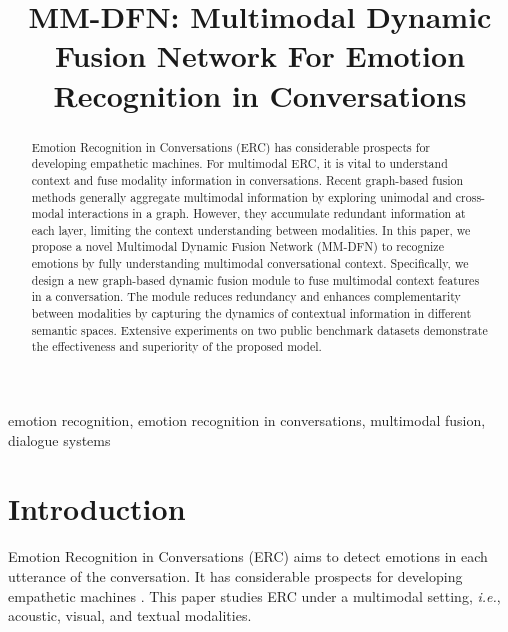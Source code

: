 \documentclass{article}
\title{MM-DFN: Multimodal Dynamic Fusion Network For Emotion Recognition in Conversations}
\begin{document}
\maketitle
\begin{abstract}


  Emotion Recognition in Conversations (ERC) has considerable prospects for developing empathetic machines. For multimodal ERC, it is vital to understand context and fuse modality information in conversations. Recent graph-based fusion methods generally aggregate multimodal information by exploring unimodal and cross-modal interactions in a graph. However, they accumulate redundant information at each layer, limiting the context understanding between modalities. In this paper, we propose a novel Multimodal Dynamic Fusion Network (MM-DFN) to recognize emotions by fully understanding multimodal conversational context. Specifically, we design a new graph-based dynamic fusion module to fuse multimodal context features in a conversation.  The module reduces redundancy and enhances complementarity between modalities by capturing the dynamics of contextual information in different semantic spaces. Extensive experiments on two public benchmark datasets demonstrate the effectiveness and superiority of the proposed model. 
\end{abstract}


\begin{keywords}
emotion recognition, emotion recognition in conversations, multimodal fusion, dialogue systems
\end{keywords}






\section{Introduction}
\label{sec:intro}
Emotion Recognition in Conversations (ERC) aims to detect emotions in each utterance of the conversation.  It has considerable prospects for developing empathetic machines \cite{DBLP:journals/inffus/MaNXC20}.
This paper studies ERC under a multimodal setting,
\textit{i.e.}, acoustic, visual, and textual modalities. 
\end{document}

